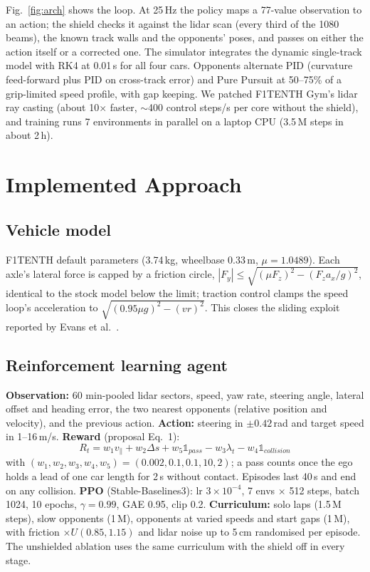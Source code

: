 \documentclass[conference]{IEEEtran}
\begin{document}
Fig.~\ref{fig:arch} shows the loop. At 25\,Hz the policy maps a 77-value observation to an action; the shield
checks it against the lidar scan (every third of the 1080 beams), the known track walls and the opponents' poses, and passes on
either the action itself or a corrected one. The simulator integrates the dynamic single-track model with RK4 at
0.01\,s for all four cars. Opponents alternate PID (curvature feed-forward plus PID on cross-track error) and Pure
Pursuit at 50--75\% of a grip-limited speed profile, with gap keeping. We patched F1TENTH Gym's lidar ray casting
(about 10$\times$ faster, $\sim$400 control steps/s per core without the shield), and training runs 7
environments in parallel on a laptop CPU (3.5\,M steps in about 2\,h).

\section{Implemented Approach}
\subsection{Vehicle model}
F1TENTH default parameters (3.74\,kg, wheelbase 0.33\,m, $\mu = 1.0489$). Each axle's lateral force is capped by a
friction circle, $|F_y| \le \sqrt{(\mu F_z)^2 - (F_z a_x/g)^2}$, identical to the stock model below the limit;
traction control clamps the speed loop's acceleration to $\sqrt{(0.95\mu g)^2 - (v r)^2}$. This closes the
sliding exploit reported by Evans et al.~\cite{evans2023}.

\subsection{Reinforcement learning agent}
\textbf{Observation:} 60 min-pooled lidar sectors, speed, yaw rate, steering angle, lateral offset and heading
error, the two nearest opponents (relative position and velocity), and the previous action.
\textbf{Action:} steering in $\pm0.42$\,rad and target speed in 1--16\,m/s. \textbf{Reward} (proposal Eq.~1):
\begin{equation}
R_t = w_1 v_\parallel + w_2 \Delta s + w_5 \mathbb{1}_{pass} - w_3 \lambda_t - w_4 \mathbb{1}_{collision}
\end{equation}
with $(w_1,w_2,w_3,w_4,w_5) = (0.002, 0.1, 0.1, 10, 2)$; a pass counts once the ego holds a lead of one car
length for 2\,s without contact. Episodes last 40\,s and end on any collision.
\textbf{PPO} (Stable-Baselines3): lr $3\!\times\!10^{-4}$, 7 envs $\times$ 512 steps, batch 1024, 10 epochs,
$\gamma = 0.99$, GAE 0.95, clip 0.2. \textbf{Curriculum:} solo laps (1.5\,M steps), slow opponents (1\,M),
opponents at varied speeds and start gaps (1\,M), with friction $\times U(0.85, 1.15)$ and lidar noise up to
5\,cm randomised per episode. The unshielded ablation uses the same curriculum with the shield off in every stage.
\end{document}
